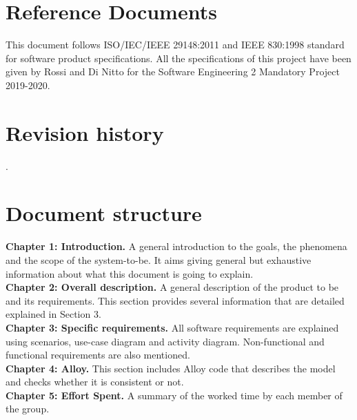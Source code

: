 \documentclass[../RASD.tex]{subfiles}
\begin{document}
    \section{Reference Documents}\label{sec:reference-documents}
    This document follows ISO/IEC/IEEE 29148:2011 and IEEE 830:1998 standard for software product specifications.
    All the specifications of this project have been given by Rossi and Di Nitto for the Software Engineering 2 Mandatory Project 2019-2020.

    \section{Revision history}\label{sec:revision-history}
    .

    \section{Document structure}\label{sec:document-structure}
    \textbf{Chapter 1: Introduction.} A general introduction to the goals, the phenomena and the scope of the system-to-be.
    It aims giving general but exhaustive information about what this document is going to explain.
    \\
    \textbf{Chapter 2: Overall description.} A general description of the product to be and its requirements.
    This section provides several information that are detailed explained in Section 3.
    \\
    \textbf{Chapter 3: Specific requirements.} All software requirements are explained using scenarios, use-case diagram and activity diagram.
    Non-functional and functional requirements are also mentioned.
    \\
    \textbf{Chapter 4: Alloy.} This section includes Alloy code that describes the model and checks whether it is consistent or not.
    \\
    \textbf{Chapter 5: Effort Spent.} A summary of the worked time by each member of the group.
\end{document}
